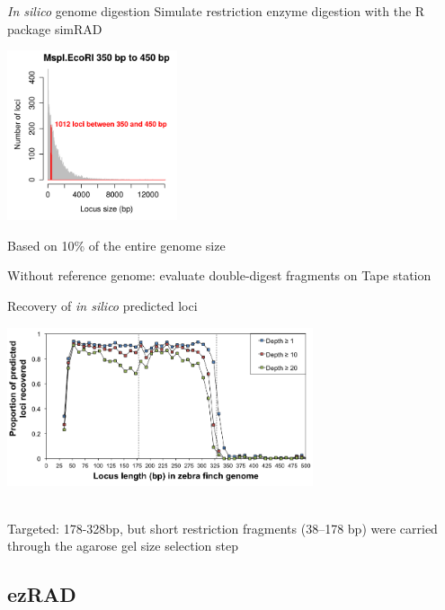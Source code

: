 \documentclass[presentation]{beamer}
\begin{document}
\begin{frame}[label=sec-2-2-7]{\emph{In silico} genome digestion}
Simulate restriction enzyme digestion with the R package simRAD \citep{Lepais2014}
\begin{center}
\includegraphics[width=5cm]{MspIEcoRI350to450.png}

\small{Based on 10\% of the entire genome size}
\end{center}
Without reference genome: evaluate double-digest fragments on Tape station
\end{frame}

\begin{frame}[label=sec-2-2-8]{Recovery of \emph{in silico} predicted loci}
\begin{center}
\includegraphics[width=9cm]{DaCosta2014Fig1a.png}

 \tiny{\citep{Dacosta2014}}\\
\small{Targeted: 178-328bp, but short restriction fragments (38–178 bp) were carried through the agarose gel size selection step}
 \end{center}
\end{frame}

\subsection{ezRAD}
\label{sec-2-3}
\end{document}
